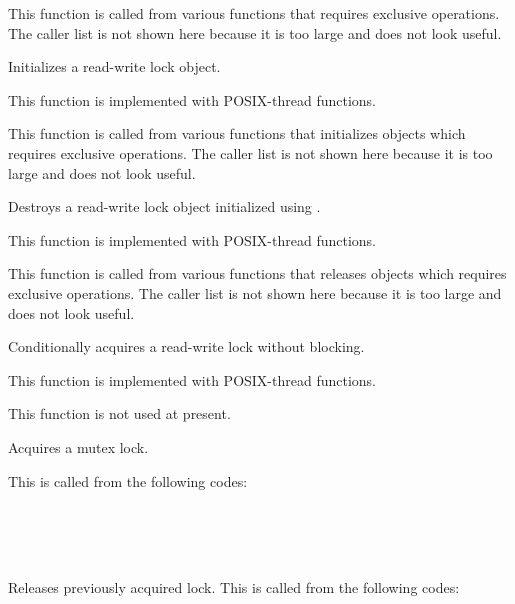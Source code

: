	This function is called from various functions that requires exclusive operations.
	The caller list is not shown here because it is too large and does not look useful.


	Initializes a read-write lock object.

	This function is implemented with POSIX-thread functions.

	This function is called from various functions that initializes objects which requires
	exclusive operations.
	The caller list is not shown here because it is too large and does not look useful.


	Destroys a read-write lock object initialized using .

	This function is implemented with POSIX-thread functions.

	This function is called from various functions that releases objects which requires
	exclusive operations.
	The caller list is not shown here because it is too large and does not look useful.


	Conditionally acquires a read-write lock without blocking.

	This function is implemented with POSIX-thread functions.

	This function is not used at present.


	Acquires a mutex lock.

	This is called from the following codes:

	\FuncRefHdr
	  \\
	  \\
	  \\
	  \hline
	\FuncRefTrailor


	Releases previously acquired lock.
	This is called from the following codes:

